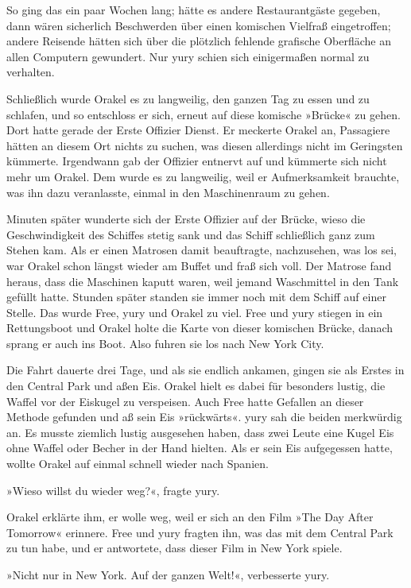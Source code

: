 So ging das ein paar Wochen lang; hätte es andere Restaurantgäste gegeben, dann wären sicherlich Beschwerden über einen komischen Vielfraß eingetroffen; andere Reisende hätten sich über die plötzlich fehlende grafische Oberfläche an allen Computern gewundert. Nur yury schien sich einigermaßen normal zu verhalten.

Schließlich wurde Orakel es zu langweilig, den ganzen Tag zu essen und zu schlafen, und so entschloss er sich, erneut auf diese komische »Brücke« zu gehen. Dort hatte gerade der Erste Offizier Dienst. Er meckerte Orakel an, Passagiere hätten an diesem Ort nichts zu suchen, was diesen allerdings nicht im Geringsten kümmerte. Irgendwann gab der Offizier entnervt auf und kümmerte sich nicht mehr um Orakel. Dem wurde es zu langweilig, weil er Aufmerksamkeit brauchte, was ihn dazu veranlasste, einmal in den Maschinenraum zu gehen.

Minuten später wunderte sich der Erste Offizier auf der Brücke, wieso die Geschwindigkeit des Schiffes stetig sank und das Schiff schließlich ganz zum Stehen kam. Als er einen Matrosen damit beauftragte, nachzusehen, was los sei, war Orakel schon längst wieder am Buffet und fraß sich voll. Der Matrose fand heraus, dass die Maschinen kaputt waren, weil jemand Waschmittel in den Tank gefüllt hatte. Stunden später standen sie immer noch mit dem Schiff auf einer Stelle. Das wurde Free, yury und Orakel zu viel. Free und yury stiegen in ein Rettungsboot und Orakel holte die Karte von dieser komischen Brücke, danach sprang er auch ins Boot. Also fuhren sie los nach New York City.

Die Fahrt dauerte drei Tage, und als sie endlich ankamen, gingen sie als Erstes in den Central Park und aßen Eis. Orakel hielt es dabei für besonders lustig, die Waffel vor der Eiskugel zu verspeisen. Auch Free hatte Gefallen an dieser Methode gefunden und aß sein Eis »rückwärts«. yury sah die beiden merkwürdig an. Es musste ziemlich lustig ausgesehen haben, dass zwei Leute eine Kugel Eis ohne Waffel oder Becher in der Hand hielten. Als er sein Eis aufgegessen hatte, wollte Orakel auf einmal schnell wieder nach Spanien.

»Wieso willst du wieder weg?«, fragte yury.

Orakel erklärte ihm, er wolle weg, weil er sich an den Film »The Day After Tomorrow« erinnere. Free und yury fragten ihn, was das mit dem Central Park zu tun habe, und er antwortete, dass dieser Film in New York spiele.

»Nicht nur in New York. Auf der ganzen Welt!«, verbesserte yury.


